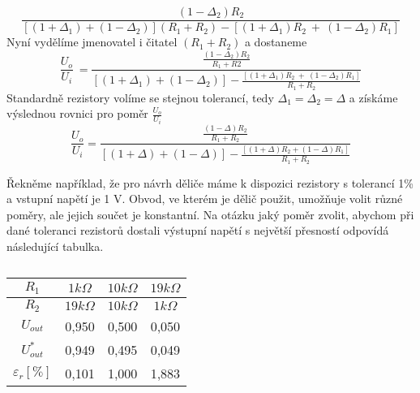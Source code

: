\begin{example}
\begin{equation*}
        \frac{(1-\Delta_2) R_2}{[(1+\Delta_1) + (1-\Delta_2)](R_1+R_2) - 
        [(1+\Delta_1) R_2\ +\ (1-\Delta_2) R_1] }
  \end{equation*}
  Nyní vydělíme jmenovatel i čitatel $(R_1 + R_2)$ a dostaneme 
  \begin{equation}\label{TEO:eq_divider_2}
    \frac{U_o}{U_i}\ =\frac{\frac{(1-\Delta_2) R_2}{R_1+R2}}{[(1+\Delta_1)+(1-\Delta_2)] - 
    \frac{[(1+\Delta_1) R_2\ +\ (1-\Delta_2) R_1]}{R_1+R_2} }
  \end{equation}
  Standardně rezistory volíme se stejnou tolerancí, tedy $\Delta_1 = \Delta_2 = \Delta$ a získáme 
  výslednou rovnici pro poměr $\frac{U_o}{U_i}$ 
  \begin{equation}
     \frac{U_o}{U_i} = \frac{\frac{(1-\Delta) R_2}{R_1+R_2}}{[(1+\Delta)+(1-\Delta)] - 
     \frac{[(1+\Delta) 
     R_2 + (1-\Delta) R_1]}{R_1+R_2} }
  \end{equation}

  Řekněme například, že pro návrh děliče máme k dispozici rezistory s tolerancí 1\% a vstupní 
  napětí je 1 V. Obvod, ve kterém je dělič použit, umožňuje volit různé poměry, ale jejich součet 
  je konstantní. Na otázku jaký poměr zvolit, abychom při dané toleranci rezistorů dostali 
  výstupní napětí s největší přesností odpovídá následující tabulka.
  \begin{table}[ht!]
   \centering
    \setlength{\tabcolsep}{5pt}
    \begin{tabular}{|c|c|c|c|}
      \hline
        $R_1$                 & $1 k\Omega$  & $10 k\Omega$     & $19 k\Omega$   \\
      \hline
        $R_2$                 & $19 k\Omega$ & $10 k\Omega$     & $1 k\Omega$    \\
      \hline
        $U_{out}$             & 0,950        & 0,500            & 0,050          \\
      \hline
        $U_{out}^*$           & 0,949        & 0,495            & 0,049          \\
      \hline
        $\varepsilon_r [\%]$  & 0,101        & 1,000            & 1,883          \\
      \hline
   \end{tabular}
   \caption{ }
   \label{TEO:tab_divider_accuracy}
  \end{table}

\end{example}  
  